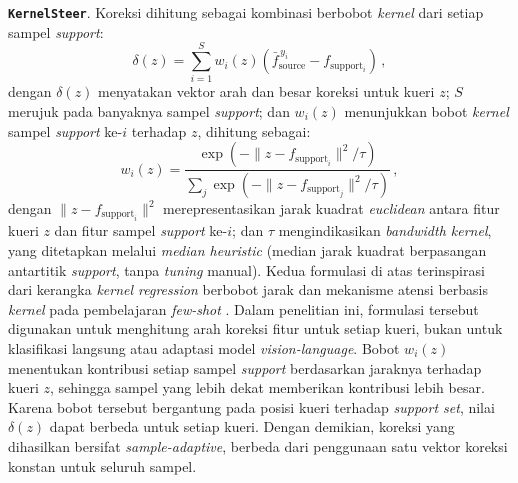 \documentclass[conference]{IEEEtran}
\newcommand{\nama}[1]{\textbf{\texttt{#1}}}
\newcommand{\myparagraph}[1]{\vspace{0.2cm}\noindent\textbf{#1}.}
\begin{document}
\myparagraph{\nama{KernelSteer}} Koreksi dihitung sebagai kombinasi berbobot \textit{kernel} dari setiap sampel \textit{support}:
\begin{equation}
\delta(z) = \sum_{i=1}^{S} w_i(z)\left(\bar{f}_{\text{source}}^{\,y_i} - f_{\text{support}_i}\right) \, ,
\tag*{}\label{eq:kernel}
\end{equation}
dengan $\delta(z)$ menyatakan vektor arah dan besar koreksi untuk kueri $z$; $S$ merujuk pada banyaknya sampel \textit{support}; dan $w_i(z)$ menunjukkan bobot \textit{kernel} sampel \textit{support} ke-$i$ terhadap $z$, dihitung sebagai:
\begin{equation}
w_i(z) = \frac{\exp(-\lVert z-f_{\text{support}_i}\rVert^2/\tau)}{\sum_j \exp(-\lVert z-f_{\text{support}_j}\rVert^2/\tau)} \, ,
\tag*{}\label{eq:kernelweight}
\end{equation}
dengan $\lVert z-f_{\text{support}_i}\rVert^2$ merepresentasikan jarak kuadrat \textit{euclidean} antara fitur kueri $z$ dan fitur sampel \textit{support} ke-$i$; dan $\tau$ mengindikasikan \textit{bandwidth kernel}, yang ditetapkan melalui \textit{median heuristic} \cite{b18} (median jarak kuadrat berpasangan antartitik \textit{support}, tanpa \textit{tuning} manual). Kedua formulasi di atas terinspirasi dari kerangka \textit{kernel regression} berbobot jarak dan mekanisme atensi berbasis \textit{kernel} pada pembelajaran \textit{few-shot} \cite{b16,b17}. Dalam penelitian ini, formulasi tersebut digunakan untuk menghitung arah koreksi fitur untuk setiap kueri, bukan untuk klasifikasi langsung atau adaptasi model \textit{vision-language}. Bobot $w_i(z)$ menentukan kontribusi setiap sampel \textit{support} berdasarkan jaraknya terhadap kueri $z$, sehingga sampel yang lebih dekat memberikan kontribusi lebih besar. Karena bobot tersebut bergantung pada posisi kueri terhadap \textit{support set}, nilai $\delta(z)$ dapat berbeda untuk setiap kueri. Dengan demikian, koreksi yang dihasilkan bersifat \textit{sample-adaptive}, berbeda dari penggunaan satu vektor koreksi konstan untuk seluruh sampel.
\end{document}

